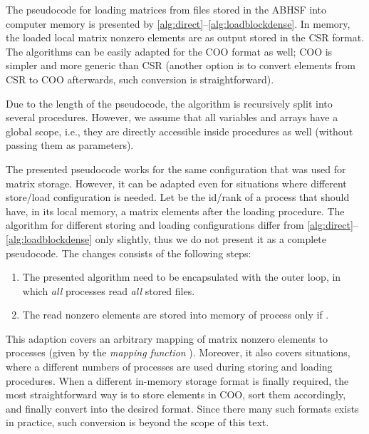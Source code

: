 \documentclass[10pt,a4paper]{article}
\begin{document}
The pseudocode for loading matrices from files stored in the ABHSF into computer memory is presented by \autoref{alg:direct}--\ref{alg:loadblockdense}. In memory, the loaded local matrix nonzero elements are as output stored in the CSR format. The algorithms can be easily adapted for the COO format as well; COO is simpler and more generic than CSR (another option is to convert elements from CSR to COO afterwards, such conversion is straightforward). 

Due to the length of the pseudocode, the algorithm is recursively split into several procedures. However, we assume that all variables and arrays have a global scope, i.e., they are directly accessible inside procedures as well (without passing them as parameters).

The presented pseudocode works for the same configuration that was used for matrix storage. However, it can be adapted even for situations where different store/load configuration is needed. Let  be the id/rank of a process that should have, in its local memory, a matrix elements  after the loading procedure. The algorithm for different storing and loading configurations differ from \autoref{alg:direct}--\ref{alg:loadblockdense} only slightly, thus we do not present it as a complete pseudocode. The changes consists of the following steps:
\begin{enumerate}
\item The presented algorithm need to be encapsulated with the outer loop, in which \emph{all} processes read \emph{all} stored files.
\item The read nonzero elements are stored into memory of process  only if .
\end{enumerate}

This adaption covers an arbitrary mapping of matrix nonzero elements to processes (given by the \emph{mapping function} ). Moreover, it also covers situations, where a different numbers of processes are used during storing and loading procedures. When a different in-memory storage format is finally required, the most straightforward way is to store elements in COO, sort them accordingly, and finally convert into the desired format. Since there many such formats exists in practice, such conversion is beyond the scope of this text.
\end{document}
